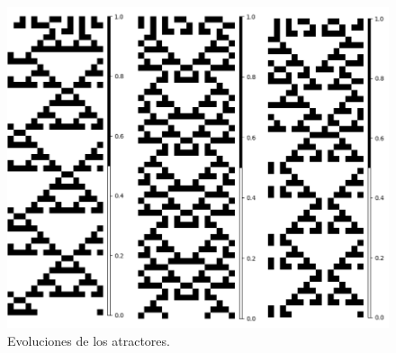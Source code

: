 \documentclass[11pt]{article}
\begin{document}
\begin{figure}[H]
			\includegraphics[scale=0.3]{resources/Atractores22/atractor_22_size_16_res2.png}
			\caption{Evoluciones de los atractores.}\label{fig:picture}
			\end{figure}
\end{document}

